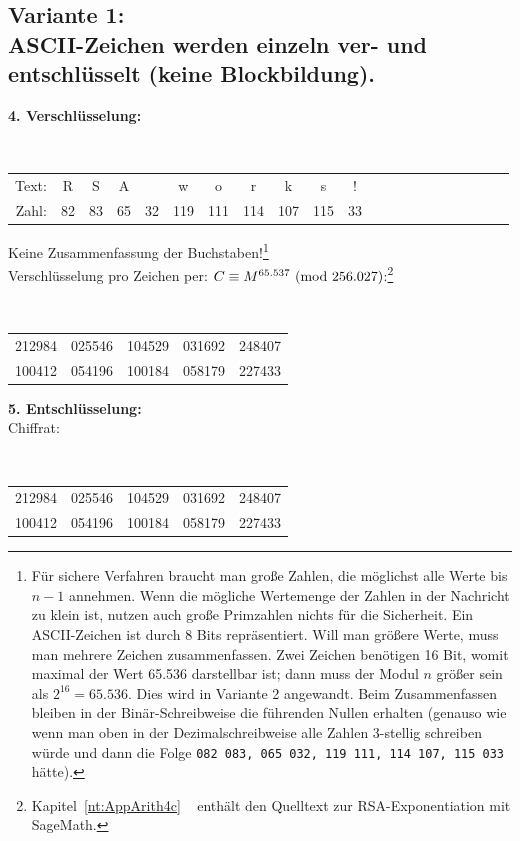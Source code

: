 \begin{refsegment}
\subsection*{Variante 1:\\ ASCII-Zeichen werden einzeln ver- und entschlüsselt (keine Blockbildung).}

\textbf{4. Verschlüsselung:}\\
{\tt
\begin{tabular}{rcccccccccccccccccccc}
{\rm Text:} & R & S & A &   & w & o & r & k & s & !\\
{\rm Zahl:} & 82 & 83 & 65 & 32 & 119 & 111 & 114 & 107 & 115 & 33
\end{tabular} } %

 Keine Zusammenfassung der Buchstaben!\footnote{%
Für sichere Verfahren braucht man große Zahlen, die möglichst alle Werte bis
$n-1$ annehmen. Wenn die mögliche Wertemenge der Zahlen in der Nachricht zu
klein ist, nutzen auch große Primzahlen nichts für die Sicherheit.
Ein ASCII-Zeichen ist durch $8$ Bits repräsentiert. Will man größere Werte,
muss man mehrere Zeichen zusammenfassen. Zwei Zeichen benötigen 16 Bit, womit
maximal der Wert 65.536 darstellbar ist; dann muss der Modul $n$ größer sein als
$2^{16} = 65.536$. Dies wird in Variante 2 angewandt.
Beim Zusammenfassen bleiben in der Binär-Schreibweise die führenden Nullen
erhalten (genauso wie wenn man oben in der Dezimalschreibweise alle Zahlen
3-stellig schreiben würde und dann die Folge {\tt 082 083, 065 032,
119 111, 114 107, 115 033} hätte).
}
\label{SrcArith4c}\\
Verschlüsselung pro Zeichen per: $C \equiv M^{65.537}{\rm ~(mod~}256.027)$:\footnote{%
  Kapitel~\ref{nt:AppArith4c} \glqq {}\grqq~
  enthält den Quelltext zur RSA-Exponentiation mit SageMath.
}\\
{\tt
\begin{tabular}{lllll}
212984 & 025546 & 104529 & 031692 & 248407\\
100412 & 054196 & 100184 & 058179 & 227433\\
\end{tabular}
}

 \textbf{5. Entschlüsselung:}\\
Chiffrat:\\
{\tt
\begin{tabular}{lllll}
212984 & 025546 & 104529 & 031692 & 248407\\
100412 & 054196 & 100184 & 058179 & 227433\\
\end{tabular} }


\end{refsegment}

